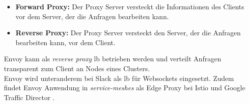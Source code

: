 \begin{itemize}
  \item \textbf{Forward Proxy:} Der Proxy Server versteckt die Informationen des Clients vor dem Server, der die Anfragen bearbeiten kann.
  \item \textbf{Reverse Proxy:} Der Proxy Server versteckt den Server, der die Anfragen bearbeiten kann, vor dem Client.
\end{itemize}
Envoy kann als \textit{reverse proxy} \acl{lb} betrieben werden und verteilt Anfragen transparent zum Client an Nodes eines Clusters.
\\
Envoy wird unteranderem bei Slack \cite{MigratingMillionsConcurrent2021} als \acl{lb} für Websockets eingesetzt. Zudem findet Envoy Anwendung in \textit{service-meshes} als Edge Proxy bei Istio \cite{Istio} und Google Traffic Director \cite{TrafficDirectorGoogle}.

\newpage
